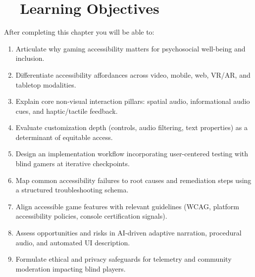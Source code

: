\section{~~Learning Objectives}
\label{sec:gaming-learning-objectives}
After completing this chapter you will be able to:
\begin{enumerate}
	\item Articulate why gaming accessibility matters for psychosocial well-being and inclusion.
	\item Differentiate accessibility affordances across video, mobile, web, VR/AR, and tabletop modalities.
	\item Explain core non-visual interaction pillars: spatial audio, informational audio cues, and haptic/tactile feedback.
	\item Evaluate customization depth (controls, audio filtering, text properties) as a determinant of equitable access.
	\item Design an implementation workflow incorporating user-centered testing with blind gamers at iterative checkpoints.
	\item Map common accessibility failures to root causes and remediation steps using a structured troubleshooting schema.
	\item Align accessible game features with relevant guidelines (WCAG, platform accessibility policies, console certification signals).
	\item Assess opportunities and risks in AI-driven adaptive narration, procedural audio, and automated UI description.
	\item Formulate ethical and privacy safeguards for telemetry and community moderation impacting blind players.
\end{enumerate}


